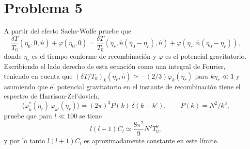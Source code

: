 \documentclass[11pt,a4paper]{article}
\begin{document}
\section*{Problema 5}
A partir del efecto Sachs-Wolfe pruebe que
\begin{equation}
  \frac{\delta T}{T_0}(\eta_0,0,\hat n)+\varphi(\eta_0,0)=\frac{\delta T}{T_0}(\eta_r,\hat n(\eta_0-\eta_r),\hat n)+\varphi(\eta_r,\hat n(\eta_0-\eta_r)),
\end{equation}
donde $\eta_r$ es el tiempo conforme de recombinación y $\varphi$ es el potencial gravitatorio. Escribiendo el lado derecho de esta ecuación como una integral de Fourier, teniendo en cuenta que $(\delta T/T_0)_k(\eta_r,\hat n)\simeq-(2/3)\varphi_k(\eta_r)$ para $k\eta_r\ll1$ y asumiendo que el potencial gravitatorio en el instante de recombinación tiene el espectro de Harrison-Zel'dovich,
\begin{equation}
  \langle\varphi_k^*(\eta_r)\,\varphi_{k'}(\eta_r)\rangle=(2\pi)^3P(k)\,\delta(k-k'), \qquad P(k)=N^2/k^3,
\end{equation}
pruebe que para $l\ll100$ se tiene
\begin{equation}
  l(l+1)C_l\simeq\frac{8\pi^2}{9}N^2T_0^2,
\end{equation}
y por lo tanto $l(l+1)C_l$ es aproximadamente constante en este límite.
\end{document}
